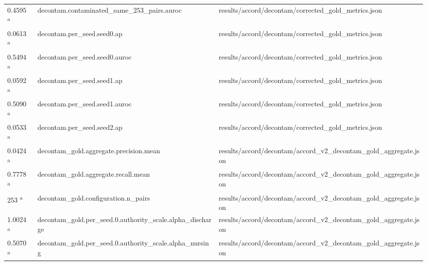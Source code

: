 \begin{longtable}{@{}p{0.7in}p{1.9in}p{2.6in}@{}}
0.4595 \textsuperscript{a} & decontam.\allowbreak{}contaminated\_same\_253\_pairs.\allowbreak{}auroc & results/\allowbreak{}accord/\allowbreak{}decontam/\allowbreak{}corrected\_gold\_metrics.\allowbreak{}json\\
0.0613 \textsuperscript{a} & decontam.\allowbreak{}per\_seed.\allowbreak{}seed0.\allowbreak{}ap & results/\allowbreak{}accord/\allowbreak{}decontam/\allowbreak{}corrected\_gold\_metrics.\allowbreak{}json\\
0.5494 \textsuperscript{a} & decontam.\allowbreak{}per\_seed.\allowbreak{}seed0.\allowbreak{}auroc & results/\allowbreak{}accord/\allowbreak{}decontam/\allowbreak{}corrected\_gold\_metrics.\allowbreak{}json\\
0.0592 \textsuperscript{a} & decontam.\allowbreak{}per\_seed.\allowbreak{}seed1.\allowbreak{}ap & results/\allowbreak{}accord/\allowbreak{}decontam/\allowbreak{}corrected\_gold\_metrics.\allowbreak{}json\\
0.5090 \textsuperscript{a} & decontam.\allowbreak{}per\_seed.\allowbreak{}seed1.\allowbreak{}auroc & results/\allowbreak{}accord/\allowbreak{}decontam/\allowbreak{}corrected\_gold\_metrics.\allowbreak{}json\\
0.0533 \textsuperscript{a} & decontam.\allowbreak{}per\_seed.\allowbreak{}seed2.\allowbreak{}ap & results/\allowbreak{}accord/\allowbreak{}decontam/\allowbreak{}corrected\_gold\_metrics.\allowbreak{}json\\
0.0424 \textsuperscript{a} & decontam\_gold.\allowbreak{}aggregate.\allowbreak{}precision.\allowbreak{}mean & results/\allowbreak{}accord/\allowbreak{}decontam/\allowbreak{}accord\_v2\_decontam\_gold\_aggregate.\allowbreak{}json\\
0.7778 \textsuperscript{a} & decontam\_gold.\allowbreak{}aggregate.\allowbreak{}recall.\allowbreak{}mean & results/\allowbreak{}accord/\allowbreak{}decontam/\allowbreak{}accord\_v2\_decontam\_gold\_aggregate.\allowbreak{}json\\
253 \textsuperscript{a} & decontam\_gold.\allowbreak{}configuration.\allowbreak{}n\_pairs & results/\allowbreak{}accord/\allowbreak{}decontam/\allowbreak{}accord\_v2\_decontam\_gold\_aggregate.\allowbreak{}json\\
1.0024 \textsuperscript{a} & decontam\_gold.\allowbreak{}per\_seed.\allowbreak{}0.\allowbreak{}authority\_scale.\allowbreak{}alpha\_discharge & results/\allowbreak{}accord/\allowbreak{}decontam/\allowbreak{}accord\_v2\_decontam\_gold\_aggregate.\allowbreak{}json\\
0.5070 \textsuperscript{a} & decontam\_gold.\allowbreak{}per\_seed.\allowbreak{}0.\allowbreak{}authority\_scale.\allowbreak{}alpha\_nursing & results/\allowbreak{}accord/\allowbreak{}decontam/\allowbreak{}accord\_v2\_decontam\_gold\_aggregate.\allowbreak{}json\\

\end{longtable}
